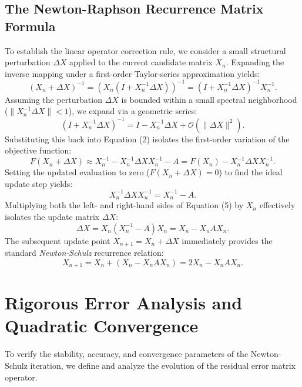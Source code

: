 \documentclass[11pt,a4paper]{article}
\begin{document}
\subsection{The Newton-Raphson Recurrence Matrix Formula}
To establish the linear operator correction rule, we consider a small structural perturbation $\Delta X$ applied to the current candidate matrix $X_n$. Expanding the inverse mapping under a first-order Taylor-series approximation yields:
\begin{equation}
(X_n + \Delta X)^{-1} = \left( X_n (I + X_n^{-1} \Delta X) \right)^{-1} = (I + X_n^{-1}\Delta X)^{-1} X_n^{-1}.
\end{equation}
Assuming the perturbation $\Delta X$ is bounded within a small spectral neighborhood ($\|X_n^{-1}\Delta X\| < 1$), we expand via a geometric series:
\begin{equation}
(I + X_n^{-1}\Delta X)^{-1} = I - X_n^{-1}\Delta X + \mathcal{O}(\|\Delta X\|^2).
\end{equation}
Substituting this back into Equation (2) isolates the first-order variation of the objective function:
\begin{equation}
F(X_n + \Delta X) \approx X_n^{-1} - X_n^{-1}\Delta X X_n^{-1} - A = F(X_n) - X_n^{-1}\Delta X X_n^{-1}.
\end{equation}
Setting the updated evaluation to zero ($F(X_n + \Delta X) = 0$) to find the ideal update step yields:
\begin{equation}
X_n^{-1}\Delta X X_n^{-1} = X_n^{-1} - A.
\end{equation}
Multiplying both the left- and right-hand sides of Equation (5) by $X_n$ effectively isolates the update matrix $\Delta X$:
\begin{equation}
\Delta X = X_n(X_n^{-1} - A)X_n = X_n - X_n A X_n.
\end{equation}
The subsequent update point $X_{n+1} = X_n + \Delta X$ immediately provides the standard \textit{Newton-Schulz} recurrence relation:
\begin{equation}
X_{n+1} = X_n + (X_n - X_n A X_n) = 2X_n - X_n A X_n.
\end{equation}

\section{Rigorous Error Analysis and Quadratic Convergence}
To verify the stability, accuracy, and convergence parameters of the Newton-Schulz iteration, we define and analyze the evolution of the residual error matrix operator.
\end{document}
